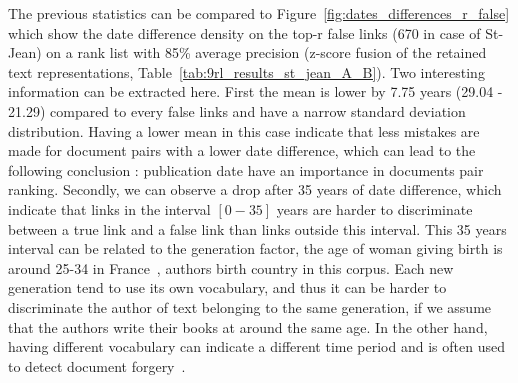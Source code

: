 The previous statistics can be compared to Figure~\ref{fig:dates_differences_r_false} which show the date difference density on the top-r false links (670 in case of St-Jean) on a rank list with 85\% average precision (z-score fusion of the retained text representations, Table~\ref{tab:9rl_results_st_jean_A_B}).
Two interesting information can be extracted here.
First the mean is lower by 7.75 years (29.04 - 21.29) compared to every false links and have a narrow standard deviation distribution.
Having a lower mean in this case indicate that less mistakes are made for document pairs with a lower date difference, which can lead to the following conclusion : publication date have an importance in documents pair ranking.
Secondly, we can observe a drop after 35 years of date difference, which indicate that links in the interval $\left[0-35\right]$ years are harder to discriminate between a true link and a false link than links outside this interval.
This 35 years interval can be related to the generation factor, the age of woman giving birth is around 25-34 in France~\cite{generations}, authors birth country in this corpus.
Each new generation tend to use its own vocabulary, and thus it can be harder to discriminate the author of text belonging to the same generation, if we assume that the authors write their books at around the same age.
In the other hand, having different vocabulary can indicate a different time period and is often used to detect document forgery~\cite{savoy_stylo}.

